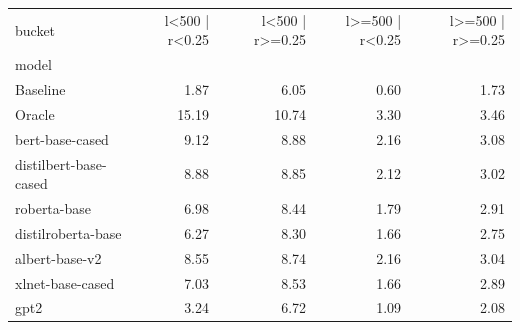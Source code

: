 \begin{tabular}{lrrrr}
\toprule
bucket & l<500 | r<0.25 & l<500 | r>=0.25 & l>=500 | r<0.25 & l>=500 | r>=0.25 \\
model &  &  &  &  \\
\midrule
Baseline & 1.87 & 6.05 & 0.60 & 1.73 \\
Oracle & 15.19 & 10.74 & 3.30 & 3.46 \\
bert-base-cased & 9.12 & 8.88 & 2.16 & 3.08 \\
distilbert-base-cased & 8.88 & 8.85 & 2.12 & 3.02 \\
roberta-base & 6.98 & 8.44 & 1.79 & 2.91 \\
distilroberta-base & 6.27 & 8.30 & 1.66 & 2.75 \\
albert-base-v2 & 8.55 & 8.74 & 2.16 & 3.04 \\
xlnet-base-cased & 7.03 & 8.53 & 1.66 & 2.89 \\
gpt2 & 3.24 & 6.72 & 1.09 & 2.08 \\
\bottomrule
\end{tabular}
